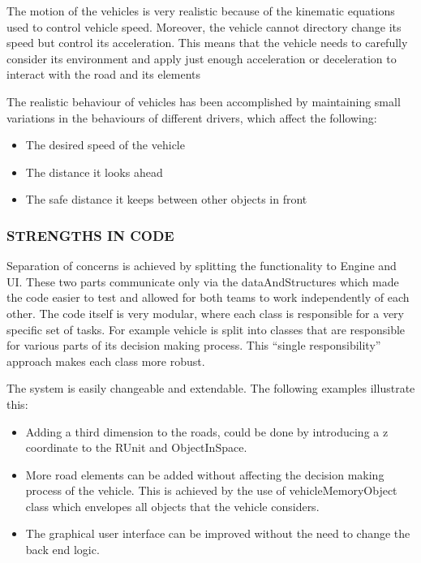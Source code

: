 \documentclass[11pt,a4paper]{article}
\begin{document}
		The motion of the vehicles is very realistic because of the kinematic equations used to control vehicle speed. Moreover, the vehicle cannot directory change its speed but control its acceleration. This means that the vehicle needs to carefully consider its environment and apply just enough acceleration or deceleration to interact with the road and its elements
		
		The realistic behaviour of vehicles has been accomplished by maintaining small variations in the behaviours of different drivers, which affect the following:
		\begin{itemize}
			\item The desired speed of the vehicle
			\item The distance it looks ahead
			\item The safe distance it keeps between other objects in front
		\end{itemize}
		
		\subsubsection{STRENGTHS IN CODE}
		Separation of concerns is achieved by splitting the functionality to Engine and UI. These two parts communicate only via the dataAndStructures which made the code easier to test and allowed for both teams to work independently of each other.
		The code itself is very modular, where each class is responsible for a very specific set of tasks. For example vehicle is split into classes that are responsible for various parts of its decision making process. This “single responsibility” approach makes each class more robust.
		
		The system is easily changeable and extendable. The following examples illustrate this:
		
		\begin{itemize}
			\item Adding a third dimension to the roads, could be done by introducing a z coordinate to the RUnit and ObjectInSpace.
			\item More road elements can be added without affecting the decision making process of the vehicle. This is achieved by the use of vehicleMemoryObject class which envelopes all objects that the vehicle considers.
			\item The graphical user interface can be improved without the need to change the back end logic. 
		\end{itemize}
		
\end{document}
